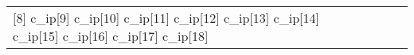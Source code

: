\begin{longtable}{| p{0.5cm} | p{3cm} | p{8.5cm} | p{4cm} |}
[8] \newline c\_ip[9] \newline c\_ip[10] \newline c\_ip[11] \newline c\_ip[12] \newline c\_ip[13] \newline c\_ip[14] \newline c\_ip[15] \newline c\_ip[16] \newline c\_ip[17] \newline c\_ip[18] \n
\end{longtable}
